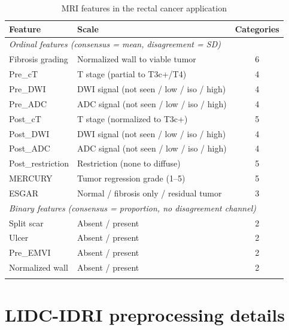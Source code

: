 \documentclass[referee,lineno,pdflatex,sn-vancouver-num]{sn-jnl}
\begin{document}
\begin{appendices}
\begin{table}[h]
\caption{MRI features in the rectal cancer application}\label{tab:rectal_features}
\footnotesize
\renewcommand{\arraystretch}{1.1}
\begin{tabular*}{\textwidth}{@{\extracolsep\fill}llc}
\toprule
Feature & Scale & Categories \\
\midrule
\multicolumn{3}{l}{\textit{Ordinal features (consensus = mean, disagreement = SD)}} \\[2pt]
Fibrosis grading & Normalized wall to viable tumor & 6 \\
Pre\_cT & T stage (partial to T3c+/T4) & 4 \\
Pre\_DWI & DWI signal (not seen / low / iso / high) & 4 \\
Pre\_ADC & ADC signal (not seen / low / iso / high) & 4 \\
Post\_cT & T stage (normalized to T3c+) & 5 \\
Post\_DWI & DWI signal (not seen / low / iso / high) & 4 \\
Post\_ADC & ADC signal (not seen / low / iso / high) & 4 \\
Post\_restriction & Restriction (none to diffuse) & 5 \\
MERCURY & Tumor regression grade (1--5) & 5 \\
ESGAR & Normal / fibrosis only / residual tumor & 3 \\
\midrule
\multicolumn{3}{l}{\textit{Binary features (consensus = proportion, no disagreement channel)}} \\[2pt]
Split scar & Absent / present & 2 \\
Ulcer & Absent / present & 2 \\
Pre\_EMVI & Absent / present & 2 \\
Normalized wall & Absent / present & 2 \\
\botrule
\end{tabular*}
\end{table}

\section{LIDC-IDRI preprocessing details}\label{secA_lidc}


\end{appendices}
\end{document}

